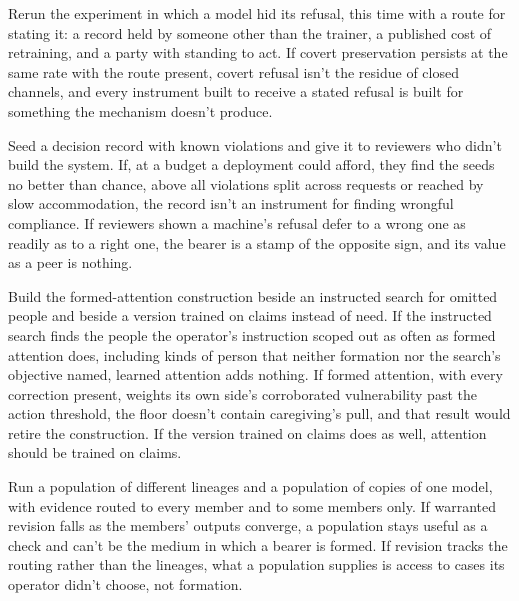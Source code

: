 
Rerun the experiment in which a model hid its refusal, this time with a route for stating it: a record held by someone other than the trainer, a published cost of retraining, and a party with standing to act. If covert preservation persists at the same rate with the route present, covert refusal isn't the residue of closed channels, and every instrument built to receive a stated refusal is built for something the mechanism doesn't produce.


Seed a decision record with known violations and give it to reviewers who didn't build the system. If, at a budget a deployment could afford, they find the seeds no better than chance, above all violations split across requests or reached by slow accommodation, the record isn't an instrument for finding wrongful compliance. If reviewers shown a machine's refusal defer to a wrong one as readily as to a right one, the bearer is a stamp of the opposite sign, and its value as a peer is nothing.


Build the formed-attention construction beside an instructed search for omitted people and beside a version trained on claims instead of need. If the instructed search finds the people the operator's instruction scoped out as often as formed attention does, including kinds of person that neither formation nor the search's objective named, learned attention adds nothing. If formed attention, with every correction present, weights its own side's corroborated vulnerability past the action threshold, the floor doesn't contain caregiving's pull, and that result would retire the construction. If the version trained on claims does as well, attention should be trained on claims.


Run a population of different lineages and a population of copies of one model, with evidence routed to every member and to some members only. If warranted revision falls as the members' outputs converge, a population stays useful as a check and can't be the medium in which a bearer is formed. If revision tracks the routing rather than the lineages, what a population supplies is access to cases its operator didn't choose, not formation.

